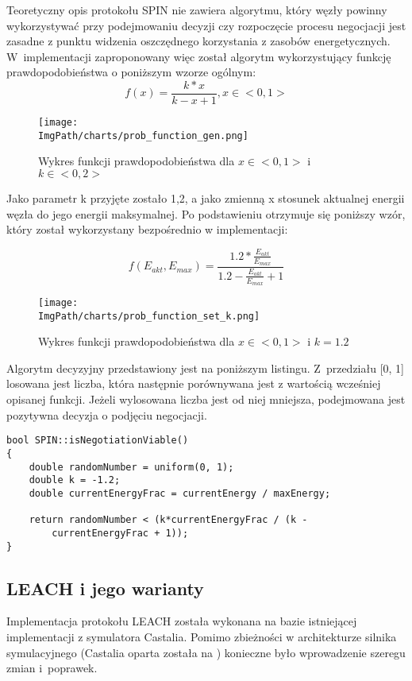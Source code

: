 Teoretyczny opis protokołu SPIN nie zawiera algorytmu, który węzły powinny wykorzystywać przy podejmowaniu decyzji czy rozpoczęcie procesu negocjacji jest zasadne z punktu widzenia oszczędnego korzystania z zasobów energetycznych. W~implementacji zaproponowany więc został algorytm wykorzystujący funkcję prawdopodobieństwa o poniższym wzorze ogólnym:
\[
	f(x) = \frac{k*x}{k - x + 1}, x \in <0, 1>
\]

\begin{figure}[H]
	\begin{center}
		\texttt{[image: \\ImgPath/charts/prob\_function\_gen.png]}
	\end{center}
	\caption{Wykres funkcji prawdopodobieństwa dla $x \in <0, 1>$ i $k \in <0, 2>$}
\end{figure}

Jako parametr k przyjęte zostało 1,2, a jako zmienną x stosunek aktualnej energii węzła do jego energii maksymalnej. Po podstawieniu otrzymuje się poniższy wzór, który został wykorzystany bezpośrednio w implementacji: 

\[
	f(E_{akt}, E_{max}) = \frac{1.2 * \frac{E_{akt}}{E_{max}}}{1.2 - \frac{E_{akt}}{E_{max}} + 1}
\]

\begin{figure}[H]
	\begin{center}
		\texttt{[image: \\ImgPath/charts/prob\_function\_set\_k.png]}
	\end{center}
	\caption{Wykres funkcji prawdopodobieństwa dla $x \in <0, 1>$ i $k = 1.2$}
\end{figure}
Algorytm decyzyjny przedstawiony jest na poniższym listingu. Z~przedziału [0, 1] losowana jest liczba, która następnie porównywana jest z wartością wcześniej opisanej funkcji. Jeżeli wylosowana liczba jest od niej mniejsza, podejmowana jest pozytywna decyzja o podjęciu negocjacji.
\begin{verbatim}
bool SPIN::isNegotiationViable()
{
    double randomNumber = uniform(0, 1);
    double k = -1.2;
    double currentEnergyFrac = currentEnergy / maxEnergy;

    return randomNumber < (k*currentEnergyFrac / (k -
        currentEnergyFrac + 1));
}
\end{verbatim}
\subsection{LEACH i jego warianty}
Implementacja protokołu LEACH została wykonana na bazie istniejącej implementacji z symulatora Castalia. Pomimo zbieżności w architekturze silnika
symulacyjnego (Castalia oparta została na \omnetpp) konieczne było wprowadzenie szeregu zmian i~poprawek.


